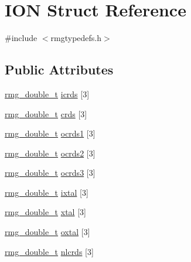 \hypertarget{struct_i_o_n}{\section{I\-O\-N Struct Reference}
\label{struct_i_o_n}
}


{\ttfamily \#include $<$rmgtypedefs.\-h$>$}

\subsection*{Public Attributes}
\begin{DoxyCompactItemize}
\item 
\hyperlink{rmgtypes_8h_aaa16921c14f121c56eaa42390a340db8}{rmg\-\_\-double\-\_\-t} \hyperlink{struct_i_o_n_a57db8b2fa5b8ee48a1bcf15842cf3a3d}{icrds} \mbox{[}3\mbox{]}
\item 
\hyperlink{rmgtypes_8h_aaa16921c14f121c56eaa42390a340db8}{rmg\-\_\-double\-\_\-t} \hyperlink{struct_i_o_n_af27f63068a76a2bcf1d5740f524f0425}{crds} \mbox{[}3\mbox{]}
\item 
\hyperlink{rmgtypes_8h_aaa16921c14f121c56eaa42390a340db8}{rmg\-\_\-double\-\_\-t} \hyperlink{struct_i_o_n_a9d1aa2e2969e8e5bb9b7be247522c4a7}{ocrds1} \mbox{[}3\mbox{]}
\item 
\hyperlink{rmgtypes_8h_aaa16921c14f121c56eaa42390a340db8}{rmg\-\_\-double\-\_\-t} \hyperlink{struct_i_o_n_a43741a972ac4ec22d36e8c8957724878}{ocrds2} \mbox{[}3\mbox{]}
\item 
\hyperlink{rmgtypes_8h_aaa16921c14f121c56eaa42390a340db8}{rmg\-\_\-double\-\_\-t} \hyperlink{struct_i_o_n_a672779fc7c76af2f309a45dd2a837d99}{ocrds3} \mbox{[}3\mbox{]}
\item 
\hyperlink{rmgtypes_8h_aaa16921c14f121c56eaa42390a340db8}{rmg\-\_\-double\-\_\-t} \hyperlink{struct_i_o_n_a2fd98b050f2c565d58cdf5fba9e0b904}{ixtal} \mbox{[}3\mbox{]}
\item 
\hyperlink{rmgtypes_8h_aaa16921c14f121c56eaa42390a340db8}{rmg\-\_\-double\-\_\-t} \hyperlink{struct_i_o_n_a86b56c9447fe7782f947f3821562c4e3}{xtal} \mbox{[}3\mbox{]}
\item 
\hyperlink{rmgtypes_8h_aaa16921c14f121c56eaa42390a340db8}{rmg\-\_\-double\-\_\-t} \hyperlink{struct_i_o_n_a13a70dd60e0f44ca01783ffff2e8ed13}{oxtal} \mbox{[}3\mbox{]}
\item 
\hyperlink{rmgtypes_8h_aaa16921c14f121c56eaa42390a340db8}{rmg\-\_\-double\-\_\-t} \hyperlink{struct_i_o_n_a6599867716c4ee50bd98629e13c3fbdd}{nlcrds} \mbox{[}3\mbox{]}
\item 

\end{DoxyCompactItemize}
